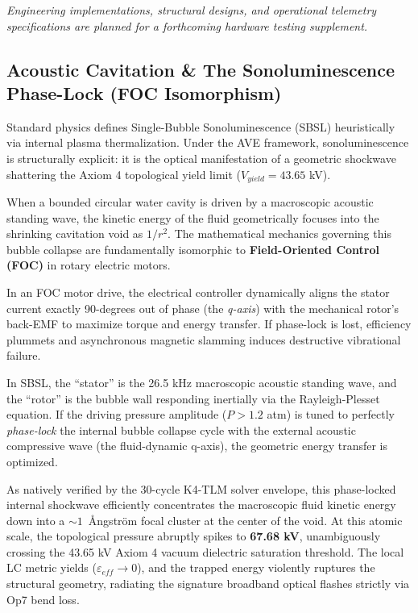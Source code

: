 \textit{Engineering implementations, structural designs, and operational telemetry specifications are planned for a forthcoming hardware testing supplement.}

\subsection{Acoustic Cavitation \& The Sonoluminescence Phase-Lock (FOC Isomorphism)}
Standard physics defines Single-Bubble Sonoluminescence (SBSL) heuristically via internal plasma thermalization. Under the AVE framework, sonoluminescence is structurally explicit: it is the optical manifestation of a geometric shockwave shattering the Axiom 4 topological yield limit ($V_{yield} = 43.65$ kV).

When a bounded circular water cavity is driven by a macroscopic acoustic standing wave, the kinetic energy of the fluid geometrically focuses into the shrinking cavitation void as $1/r^2$. The mathematical mechanics governing this bubble collapse are fundamentally isomorphic to \textbf{Field-Oriented Control (FOC)} in rotary electric motors.

In an FOC motor drive, the electrical controller dynamically aligns the stator current exactly 90-degrees out of phase (the \textit{q-axis}) with the mechanical rotor's back-EMF to maximize torque and energy transfer. If phase-lock is lost, efficiency plummets and asynchronous magnetic slamming induces destructive vibrational failure. 

In SBSL, the ``stator'' is the 26.5 kHz macroscopic acoustic standing wave, and the ``rotor'' is the bubble wall responding inertially via the Rayleigh-Plesset equation. If the driving pressure amplitude ($P > 1.2$ atm) is tuned to perfectly \textit{phase-lock} the internal bubble collapse cycle with the external acoustic compressive wave (the fluid-dynamic q-axis), the geometric energy transfer is optimized. 

As natively verified by the 30-cycle K4-TLM solver envelope, this phase-locked internal shockwave efficiently concentrates the macroscopic fluid kinetic energy down into a $\sim 1$~\AA ngstr\"om focal cluster at the center of the void. At this atomic scale, the topological pressure abruptly spikes to \textbf{67.68 kV}, unambiguously crossing the 43.65 kV Axiom 4 vacuum dielectric saturation threshold. The local LC metric yields ($\varepsilon_{eff} \to 0$), and the trapped energy violently ruptures the structural geometry, radiating the signature broadband optical flashes strictly via Op7 bend loss.

